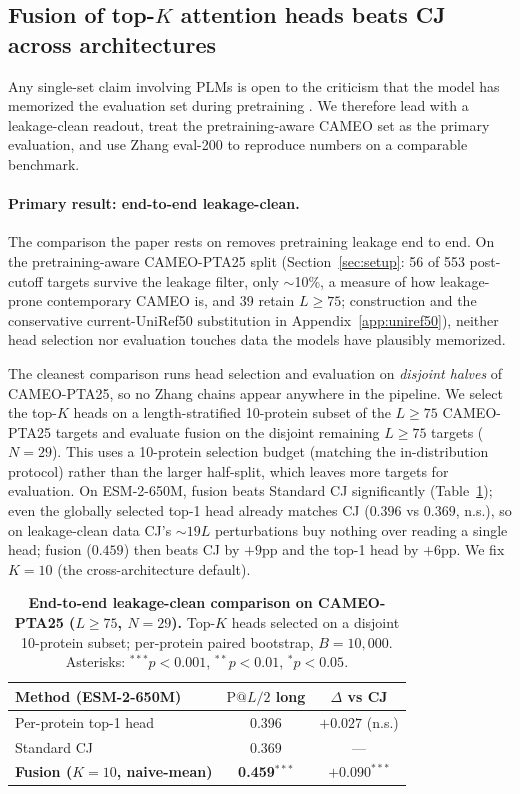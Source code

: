 \documentclass{article}
\begin{document}
\subsection{Fusion of top-$K$ attention heads beats CJ across architectures}
\label{sec:fusion-beats-cj}

Any single-set claim involving PLMs is open to the criticism that the model
has memorized the evaluation set during pretraining \citep{hermann2024leakage}.
We therefore lead with a leakage-clean readout, treat the pretraining-aware
CAMEO set as the primary evaluation, and use Zhang eval-200 \citep{zhang2024cj} to
reproduce numbers on a comparable benchmark.

\paragraph{Primary result: end-to-end leakage-clean.}
The comparison the paper rests on removes pretraining leakage end to end.
On the pretraining-aware CAMEO-PTA25 split (Section~\ref{sec:setup}: 56 of
553 post-cutoff targets survive the \citet{hermann2024leakage} leakage
filter, only $\sim$10\%, a measure of how leakage-prone contemporary CAMEO
is, and 39 retain $L \geq 75$; construction and the conservative
current-UniRef50 substitution in Appendix~\ref{app:uniref50}), neither head
selection nor evaluation touches data the models have plausibly memorized.

The cleanest comparison runs head selection and evaluation on
\emph{disjoint halves} of CAMEO-PTA25, so no Zhang chains appear
anywhere in the pipeline. We select the top-$K$ heads on a
length-stratified 10-protein subset of the $L \geq 75$ CAMEO-PTA25
targets and evaluate fusion on the disjoint remaining $L \geq 75$
targets ($N{=}29$). This uses a 10-protein selection budget (matching the
in-distribution protocol) rather than the larger half-split, which
leaves more targets for evaluation. On ESM-2-650M, fusion beats Standard
CJ significantly (Table~\ref{tab:cameo-clean}); even the globally selected
top-1 head already matches CJ ($0.396$ vs $0.369$, n.s.), so on
leakage-clean data CJ's $\sim$$19L$ perturbations buy nothing over
reading a single head; fusion ($0.459$) then beats CJ by $+9$pp and
the top-1 head by $+6$pp. We fix
$K{=}10$ (the cross-architecture default).

\begin{table}[h]
\centering
\small
\caption{\textbf{End-to-end leakage-clean comparison on CAMEO-PTA25
($L \geq 75$, $N {=} 29$).} Top-$K$ heads selected on a disjoint
10-protein subset; per-protein paired bootstrap, $B{=}10{,}000$.
Asterisks: $^{***}p<0.001$, $^{**}p<0.01$, $^*p<0.05$.}
\label{tab:cameo-clean}
\begin{tabular}{lcc}
\toprule
Method (ESM-2-650M) & $\text{P}@L/2$ long & $\Delta$ vs CJ \\
\midrule
Per-protein top-1 head & 0.396 & $+0.027$ (n.s.) \\
Standard CJ            & 0.369 & --- \\
\textbf{Fusion ($K{=}10$, naive-mean)} & \textbf{0.459}$^{***}$ & $\mathbf{+0.090^{***}}$ \\
\bottomrule
\end{tabular}
\end{table}
\end{document}
